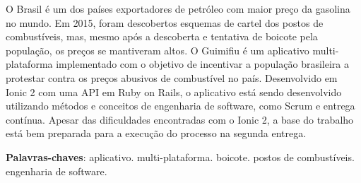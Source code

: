 \begin{resumo}

O Brasil é um dos países exportadores de petróleo com maior preço da gasolina no mundo. Em 2015, foram descobertos esquemas de cartel dos postos de combustíveis, mas, mesmo após a descoberta e tentativa de boicote pela população, os preços se mantiveram altos. O Guimifiu é um aplicativo multi-plataforma implementado com o objetivo de incentivar a população brasileira a protestar contra os preços abusivos de combustível no país. Desenvolvido em Ionic 2 com uma API em Ruby on Rails, o aplicativo está sendo desenvolvido utilizando métodos e conceitos de engenharia de software, como Scrum e entrega contínua. Apesar das dificuldades encontradas com o Ionic 2, a base do trabalho está bem preparada para a execução do processo na segunda entrega.

 \vspace{\onelineskip}

 \noindent
 \textbf{Palavras-chaves}: aplicativo. multi-plataforma. boicote. postos de combustíveis. engenharia de software. 
\end{resumo}
